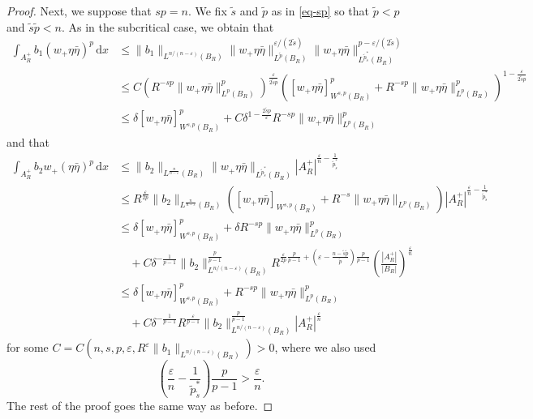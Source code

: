 \documentclass[11pt]{amsart}
\theoremstyle{plain}
\theoremstyle{definition}
\numberwithin{equation}{section}
\begin{document}
\begin{proof}
Next, we suppose that $sp=n$. We fix $\tilde{s}$ and $\tilde{p}$ as in \eqref{eq-sp} so that $\tilde{p}<p$ and $\tilde{s}\tilde{p}<n$. As in the subcritical case, we obtain that
\begin{equation*}
\begin{split}
\int_{A^+_R} b_1 (w_+\eta\bar{\eta})^{p} \,\mathrm{d}x
&\leq \|b_1\|_{L^{n/(n-\varepsilon)}(B_R)} \|w_+\eta\bar{\eta}\|_{L^{\tilde{p}}(B_R)}^{\varepsilon/(2\tilde{s})} \|w_+\eta\bar{\eta}\|_{L^{\tilde{p}^{\ast}_{\tilde{s}}}(B_R)}^{p-\varepsilon/(2\tilde{s})} \\
&\leq C \left( R^{-sp} \|w_+\eta\bar{\eta}\|_{L^p(B_R)}^p \right)^{\frac{\varepsilon}{2\tilde{s}p}} \left( [w_+\eta\bar{\eta}]_{W^{s, p}(B_R)}^p + R^{-sp} \|w_+\eta\bar{\eta}\|_{L^p(B_R)}^p \right)^{1-\frac{\varepsilon}{2\tilde{s}p}} \\
&\leq \delta [w_+\eta\bar{\eta}]_{W^{s, p}(B_R)}^p + C \delta^{1-\frac{2\tilde{s}p}{\varepsilon}} R^{-sp} \|w_+\eta\bar{\eta}\|_{L^p(B_R)}^p
\end{split}
\end{equation*}
and that
\begin{equation*}
\begin{split}
\int_{A^+_R} b_2 w_+ (\eta\bar{\eta})^p \,\mathrm{d}x
&\leq \|b_2\|_{L^{\frac{n}{n-\varepsilon}}(B_R)} \|w_+\eta\bar{\eta}\|_{L^{\tilde{p}^{\ast}_{\tilde{s}}}(B_R)}|A^+_R|^{\frac{\varepsilon}{n}-\frac{1}{\tilde{p}_{\tilde{s}}^{\ast}}} \\
&\leq R^{\frac{\varepsilon}{2p}} \|b_2\|_{L^{\frac{n}{n-\varepsilon}}(B_R)} \left( [w_+\eta\bar{\eta}]_{W^{s,p}(B_R)}+R^{-s}\|w_+\eta\bar{\eta}\|_{L^{p}(B_R)}\right) |A^+_R|^{\frac{\varepsilon}{n}-\frac{1}{\tilde{p}_{\tilde{s}}^{\ast}}} \\
&\leq \delta [w_+\eta\bar{\eta}]_{W^{s, p}(B_R)}^p + \delta R^{-sp} \|w_+\eta\bar{\eta}\|^p_{L^{p}(B_R)}\\
&\quad + C\delta^{-\frac{1}{p-1}} \|b_2\|^{\frac{p}{p-1}}_{L^{n/(n-\varepsilon)}(B_R)} R^{\frac{\varepsilon}{2p} \frac{p}{p-1} + \left(\varepsilon-\frac{n-\tilde{s}\tilde{p}}{\tilde{p}}\right)\frac{p}{p-1}} \left(\frac{|A^+_R|}{|B_R|}\right)^{\frac{\varepsilon}{n}}\\
&\leq \delta [w_+\eta\bar{\eta}]_{W^{s, p}(B_R)}^p + R^{-sp} \|w_+\eta\bar{\eta}\|^p_{L^{p}(B_R)} \\
&\quad+ C\delta^{-\frac{1}{p-1}} R^{\frac{\varepsilon}{p-1}}\|b_2\|^{\frac{p}{p-1}}_{L^{n/(n-\varepsilon)}(B_R)}|A^+_R|^{\frac{\varepsilon}{n}}
\end{split}
\end{equation*}
for some $C=C(n, s, p, \varepsilon, R^\varepsilon \|b_1\|_{L^{n/(n-\varepsilon)}(B_R)})>0$, where we also used
\begin{equation*}
\left( \frac{\varepsilon}{n} - \frac{1}{\tilde{p}_{\tilde{s}}^{\ast}} \right) \frac{p}{p-1} > \frac{\varepsilon}{n}.
\end{equation*}
The rest of the proof goes the same way as before.
\end{proof}
\end{document}
